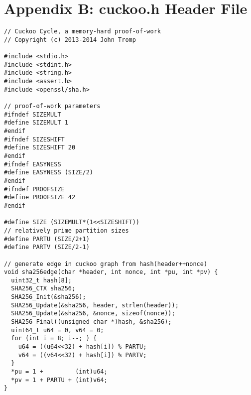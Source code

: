 \documentclass[11pt, oneside]{article}
\begin{document}
\section{Appendix B: cuckoo.h Header File}
\footnotesize
\begin{verbatim}
// Cuckoo Cycle, a memory-hard proof-of-work
// Copyright (c) 2013-2014 John Tromp

#include <stdio.h>
#include <stdint.h>
#include <string.h>
#include <assert.h>
#include <openssl/sha.h>

// proof-of-work parameters
#ifndef SIZEMULT 
#define SIZEMULT 1
#endif
#ifndef SIZESHIFT 
#define SIZESHIFT 20
#endif
#ifndef EASYNESS 
#define EASYNESS (SIZE/2)
#endif
#ifndef PROOFSIZE 
#define PROOFSIZE 42
#endif

#define SIZE (SIZEMULT*(1<<SIZESHIFT))
// relatively prime partition sizes
#define PARTU (SIZE/2+1)
#define PARTV (SIZE/2-1)

// generate edge in cuckoo graph from hash(header++nonce)
void sha256edge(char *header, int nonce, int *pu, int *pv) {
  uint32_t hash[8];
  SHA256_CTX sha256;
  SHA256_Init(&sha256);
  SHA256_Update(&sha256, header, strlen(header));
  SHA256_Update(&sha256, &nonce, sizeof(nonce));
  SHA256_Final((unsigned char *)hash, &sha256);
  uint64_t u64 = 0, v64 = 0;
  for (int i = 8; i--; ) {
    u64 = ((u64<<32) + hash[i]) % PARTU;
    v64 = ((v64<<32) + hash[i]) % PARTV;
  }
  *pu = 1 +         (int)u64;
  *pv = 1 + PARTU + (int)v64;
}
\end{verbatim}
\end{document}

